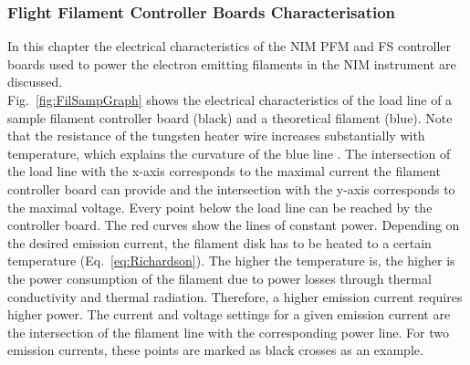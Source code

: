 		\subsubsection{Flight Filament Controller Boards Characterisation}
		In this chapter the electrical characteristics of the NIM PFM and FS controller boards used to power the electron emitting filaments in the NIM instrument are discussed.\\
		Fig.~\ref{fig:FilSampGraph} shows the electrical characteristics of the load line of a sample filament controller board (black) and a theoretical filament (blue). Note that the resistance of the tungsten heater wire increases substantially with temperature, which explains the curvature of the blue line \cite{Wilthan_2005}. The intersection of the load line with the x-axis corresponds to the maximal current the filament controller board can provide and the intersection with the y-axis corresponds to the maximal voltage. Every point below the load line can be reached by the controller board. The red curves show the lines of constant power. Depending on the desired emission current, the filament disk has to be heated to a certain temperature (Eq.~\eqref{eq:Richardson}). The higher the temperature is, the higher is the power consumption of the filament due to power losses through thermal conductivity and thermal radiation.	Therefore, a higher emission current requires higher power. The current and voltage settings for a given emission current are the intersection of the filament line with the corresponding power line. For two emission currents, these points are marked as black crosses as an example.\\
